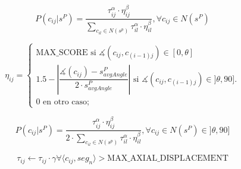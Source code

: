 
\begin{equation}
P(c_{ij} | s^{P}) = \frac
        {\tau_{ij}^{\alpha} \cdot \eta_{ij}^{\beta}}
        {\sum\limits_{c_{il}\in N(s^p)}{\tau_{il}^{\alpha} \cdot \eta_{il}^{\beta} } }, \forall c_{ij} \in N(s^{P})
\label{eq:antProbabilities}
\end{equation}

\begin{equation}
    \eta_{ij} = 
        \begin{cases} 
        \text{MAX\_SCORE si } \measuredangle(c_{ij}, c_{(i-1)j}) \in [0, \theta]\\[3ex]
        
        \text{1.5} - \left| \dfrac{\measuredangle(c_{ij}) - s^{P}_{avgAngle}} {2 \cdot s^{P}_{avgAngle}} \right| \text{ si } \measuredangle(c_{ij}, c_{(i-1)j}) \in ]\theta, 90].\\[3ex]
        
        \text{0 en otro caso;}
        \end{cases}
    \label{eq:heuristicaMiope}
\end{equation}

\begin{equation}
P(c_{ij} | s^{P}) = \frac
        {\tau_{ij}^{\alpha} \cdot \eta_{ij}^{\beta}}
        {2 \cdot \sum\limits_{c_{il}\in N(s^p)}{\tau_{il}^{\alpha} \cdot \eta_{il}^{\beta} } }, \forall c_{ij} \in N(s^{P}) \in ]\theta, 90]
    \label{eq:heuristicaMiopeSoloInterQua}
\end{equation}

\begin{equation}
    \label{eq:antiPheroSAP}
    \tau_{ij} \leftarrow \tau_{ij} \cdot \gamma  \forall \langle c_{ij},seg_{n}\rangle > \textrm{MAX\_AXIAL\_DISPLACEMENT}
\end{equation}